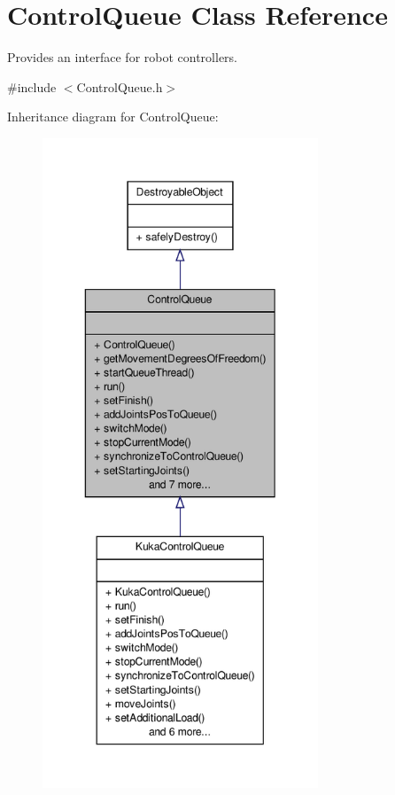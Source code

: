 \hypertarget{classControlQueue}{\section{\-Control\-Queue \-Class \-Reference}
\label{classControlQueue}
}


\-Provides an interface for robot controllers.  




{\ttfamily \#include $<$\-Control\-Queue.\-h$>$}



\-Inheritance diagram for \-Control\-Queue\-:\nopagebreak
\begin{figure}[H]
\begin{center}
\leavevmode
\includegraphics[height=550pt]{classControlQueue__inherit__graph}
\end{center}
\end{figure}


